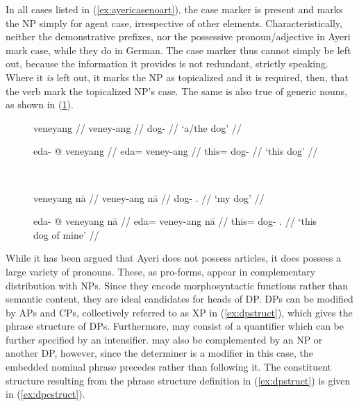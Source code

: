 In all cases listed in (\ref{ex:ayericasenoart}), the case marker is present
and marks the NP simply for agent case, irrespective of other elements.
Characteristically, neither the demonstrative prefixes, nor the possessive
pronoun/adjective in Ayeri mark case, while they do in German. The case marker
thus cannot simply be left out, because the information it provides is not
redundant, strictly speaking. Where it \emph{is} left out, it marks the NP as
topicalized and it is required, then, that the verb mark the topicalized NP's
case. The same is also true of generic nouns, as shown in
(\ref{ex:suffixcase}).

\begin{figure}[h]
\ex{}\label{ex:suffixcase}%
\begin{minipage}[t]{.5\remaining}%
	\tl\quad\begingl
		\gla veneyang //
		\glb veney-ang //
		\glc dog-\Aarg{} //
		\glft `a/the dog' //
	\endgl\medskip

	\tl\quad\begingl
		\gla eda- @ veneyang //
		\glb eda= veney-ang //
		\glc this= dog-\Aarg{} //
		\glft `this dog' //
	\endgl
\end{minipage}
~
\begin{minipage}[t]{.5\remaining}%
	\tl\quad\begingl
		\gla veneyang nā //
		\glb veney-ang nā //
		\glc dog-\Aarg{} \Fsg{}.\Gen{} //
		\glft `my dog' //
	\endgl\medskip

	\tl\quad\begingl
		\gla eda- @ veneyang nā //
		\glb eda= veney-ang nā //
		\glc this= dog-\Aarg{} \Fsg{}.\Gen{} //
		\glft `this dog of mine' //
	\endgl
\end{minipage}
\xe
\end{figure}


While it has been argued that Ayeri does not possess articles, it does possess
a large variety of pronouns. These, as pro-forms, appear in complementary
distribution with NPs. Since they encode morphosyntactic functions rather than
semantic content, they are ideal candidates for heads of DP. DPs can be
modified by APs and CPs, collectively referred to as XP in (\ref{ex:dpstruct}),
which gives the phrase structure of DPs. Furthermore,  may consist of
a quantifier which can be further specified by an intensifier.  may also
be complemented by an NP or another DP, however, since the determiner is a
modifier in this case, the embedded nominal phrase precedes  rather
than following it. The constituent structure resulting from the phrase
structure definition in (\ref{ex:dpstruct}) is given in (\ref{ex:dpcstruct}).

